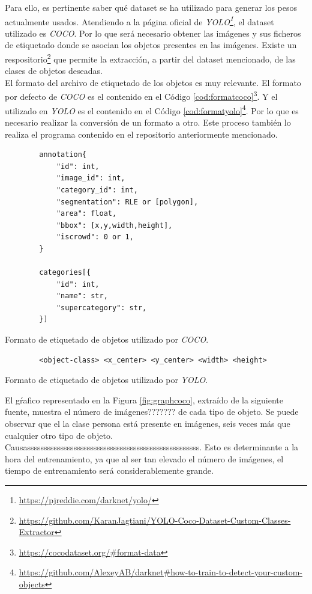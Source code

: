 Para ello, es pertinente saber qué dataset se ha utilizado para generar los pesos actualmente usados. Atendiendo a la página oficial de \textit{YOLO\footnote{\url{https://pjreddie.com/darknet/yolo/}}}, el dataset utilizado es \textit{COCO}. Por lo que será necesario obtener las imágenes y sus ficheros de etiquetado donde se asocian los objetos presentes en las imágenes. Existe un respositorio\footnote{\url{https://github.com/KaranJagtiani/YOLO-Coco-Dataset-Custom-Classes-Extractor}} que permite la extracción, a partir del dataset mencionado, de las clases de objetos deseadas.\\

El formato del archivo de etiquetado de los objetos es muy relevante. El formato por defecto de \textit{COCO} es el contenido en el Código \ref{cod:formatcoco}\footnote{\url{https://cocodataset.org/\#format-data}}. Y el utilizado en \textit{YOLO} es el contenido en el Código \ref{cod:formatyolo}\footnote{\url{https://github.com/AlexeyAB/darknet\#how-to-train-to-detect-your-custom-objects}}. Por lo que es necesario realizar la conversión de un formato a otro. Este proceso también lo realiza el programa contenido en el repositorio anteriormente mencionado.\\

\begin{code}[h]
	\begin{lstlisting}
		annotation{
			"id": int, 
			"image_id": int, 
			"category_id": int, 
			"segmentation": RLE or [polygon], 
			"area": float, 
			"bbox": [x,y,width,height], 
			"iscrowd": 0 or 1,
		}

		categories[{
			"id": int, 
			"name": str, 
			"supercategory": str,
		}]
	\end{lstlisting}
	\caption[Formato de etiquetado de objetos utilizado por \textit{COCO}.]{Formato de etiquetado de objetos utilizado por \textit{COCO}.}
	\label{cod:formatcoco}
\end{code}

\begin{code}[h]
	\begin{lstlisting}
		<object-class> <x_center> <y_center> <width> <height>
	\end{lstlisting}
	\caption[Formato de etiquetado de objetos utilizado por \textit{YOLO}.]{Formato de etiquetado de objetos utilizado por \textit{YOLO}.}
	\label{cod:formatyolo}
\end{code}

El gŕafico representado en la Figura \ref{fig:graphcoco}, extraído de la siguiente fuente\cite{graphcoco}, muestra el número de imágenes??????? de cada tipo de objeto. Se puede observar que el la clase persona está presente en imágenes, seis veces más que cualquier otro tipo de objeto. Causassssssssssssssssssssssssssssssssssssssssssssssssssss. Esto es determinante a la hora del entrenamiento, ya que al ser tan elevado el número de imágenes, el tiempo de entrenamiento será considerablemente grande.\\

